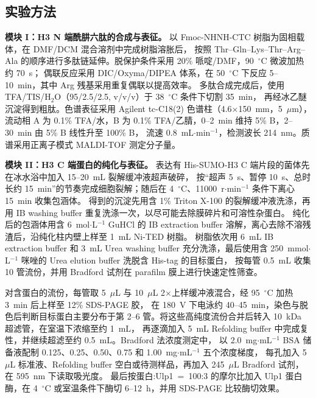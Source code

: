 \documentclass[a4paper]{article}
\begin{document}
\subsection{实验方法}

\textbf{模块 I：H3 N 端酰肼六肽的合成与表征。}
以 Fmoc-NHNH-CTC 树脂为固相载体，在 DMF/DCM 混合溶剂中完成树脂溶胀后，
按照 Thr--Gln--Lys--Thr--Arg--Ala 的顺序进行多肽链延伸。脱保护条件采用 20\% 哌啶/DMF，90~$^{\circ}$C 微波加热约 70~s；
偶联反应采用 DIC/Oxyma/DIPEA 体系，在 50~$^{\circ}$C 下反应 5--10~min，其中 Arg 残基采用重复偶联以提高效率。
多肽合成完成后，使用 TFA/TIS/H$_2$O（95/2.5/2.5, v/v/v）于 38~$^{\circ}$C 条件下切割 35~min，
再经冰乙醚沉淀得到粗肽。色谱表征采用 Agilent tc-C18(2) 色谱柱（4.6$\times$150~mm，5~$\mu$m），
流动相 A 为 0.1\% TFA/水，B 为 0.1\% TFA/乙腈，0--2~min 维持 5\% B，2--30~min 由 5\% B 线性升至 100\% B，
流速 0.8~mL$\cdot$min$^{-1}$，检测波长 214~nm。质谱采用正离子模式 MALDI-TOF 测定分子量。

\clearpage

\textbf{模块 II：H3 C 端蛋白的纯化与表征。}
表达有 His-SUMO-H3 C 端片段的菌体先在冰水浴中加入 15--20~mL 裂解缓冲液超声破碎，
按“超声 5~s、暂停 10~s、总时长约 15~min”的节奏完成细胞裂解；随后在 4~$^{\circ}$C、11000~r$\cdot$min$^{-1}$ 条件下离心 15~min 收集包涵体。
得到的沉淀先用含 1\% Triton X-100 的裂解缓冲液洗涤，再用 IB washing buffer 重复洗涤一次，以尽可能去除膜碎片和可溶性杂蛋白。
纯化后的包涵体用含 6~mol$\cdot$L$^{-1}$ GuHCl 的 IB extraction buffer 溶解，离心去除不溶残渣后，沿纯化柱内壁上样至 1~mL Ni-TED 树脂。
树脂依次用 6~mL IB extraction buffer 和 3~mL Urea washing buffer 充分洗涤，最后使用含 250~mmol$\cdot$L$^{-1}$ 咪唑的 Urea elution buffer 洗脱含 His-tag 的目标蛋白，
按每管 0.5~mL 收集 10 管流份，并用 Bradford 试剂在 parafilm 膜上进行快速定性筛查。

对含蛋白的流份，每管取 5~$\mu$L 与 10~$\mu$L 2$\times$上样缓冲液混合，经 95~$^{\circ}$C 加热 3~min 后上样至 12\% SDS-PAGE 胶，
在 180~V 下电泳约 40--45~min，染色与脱色后判断目标蛋白主要分布于第 2--6 管。将这些高纯度流份合并后转入 10~kDa 超滤管，在室温下浓缩至约 1~mL，
再逐滴加入 5~mL Refolding buffer 中完成复性，并继续超滤至约 0.5~mL。Bradford 法浓度测定中，
以 2.0~mg$\cdot$mL$^{-1}$ BSA 储备液配制 0.125、0.25、0.50、0.75 和 1.00~mg$\cdot$mL$^{-1}$ 五个浓度梯度，
每孔加入 5~$\mu$L 标准液、Refolding buffer 空白或待测样品，再加入 245~$\mu$L Bradford 试剂，在 595~nm 下读取吸光度。
最后按蛋白:Ulp1~=~100:3 的摩尔比加入 Ulp1 蛋白酶，在 4~$^{\circ}$C 或室温条件下酶切 6--12~h，并用 SDS-PAGE 比较酶切效果。
\end{document}
